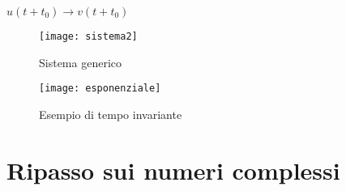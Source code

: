  $u(t+ t_0 ) \rightarrow v(t+ t_0 )$
 
\begin{figure}[h]
	\centering
	\texttt{[image: sistema2]}
	\caption{ Sistema generico }
	\label{fig:sistema2}
\end{figure}

\begin{figure}[h]
	\centering
	\texttt{[image: esponenziale]}
	\caption{ Esempio di tempo invariante }
	\label{fig:esponenziale}
\end{figure}


\pagebreak

\section{ Ripasso sui numeri complessi }